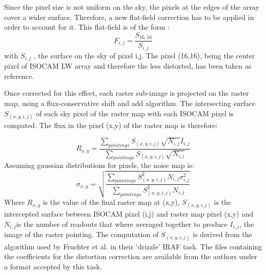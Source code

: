 Since the pixel size is not uniform on the sky, the pixels at the edges of 
the array cover a wider surface. Therefore, a new flat-field correction has 
to be applied in order to account for it. This flat-field is of the 
form :
\begin{equation}
F_{i,j} = \frac{S_{16,16}}{S_{i,j}}
\end{equation}
with $S_{i,j}$ , the surface on the sky of pixel i,j.  The pixel 
(16,16), being the center pixel of ISOCAM LW array and therefore the 
less distorted, has been taken as reference. 

Once corrected for this effect, each raster sub-image is projected on 
the raster map, using a flux-conservative shift and add algorithm. 
The intersecting surface $S_{(x,y,i,j)}$ of each sky pixel of the raster map with each 
ISOCAM pixel is computed. The flux in the pixel (x,y) 
of the raster map is therefore:
 
\begin{equation}
R_{x,y} = \frac{\sum_{pointings}S_{(x,y,i,j)}\sqrt{N_{i,j}}I_{i,j}}
{\sum_{pointings}S_{(x,y,i,j)}\sqrt{N_{i,j}}}    
\end{equation}
Assuming gaussian distributions for pixels, the noise 
map is:
\begin{equation}
\sigma_{x,y} = \sqrt{\frac{\sum_{pointings}S^{2}_{(x,y,i,j)}N_{i,j}\sigma^{2}_{i,j}}
{\sum_{pointings}S^{2}_{(x,y,i,j)}N_{i,j}}}    
\end{equation} 
Where $R_{x,y}$ is the value of the final raster map at (x,y), 
$S_{(x,y,i,j)}$ is the intercepted surface between ISOCAM pixel (i,j) 
and raster map pixel (x,y) and $N_{i,j}$is the number of readouts that 
where averaged together to produce $I_{i,j}$, the image of the raster 
pointing. The computation of $S_{(x,y,i,j)}$ is derived from the 
algorithm used by Fruchter et al. in their `drizzle' IRAF task.
The files containing the coefficients for the distortion 
correction are available from the authors under a format accepted by 
this task.
 
